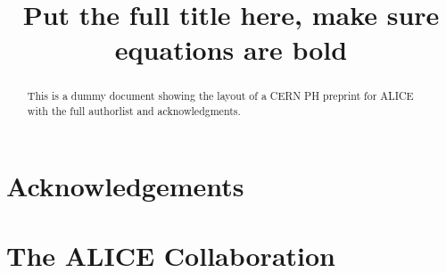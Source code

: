 \documentclass[ALICE,manyauthors]{cernphprep}
\begin{document}
%

\begin{titlepage}
%
%

\title{Put the full title here, make sure equations are bold}


\begin{abstract}
This is a dummy document showing the layout of a CERN PH preprint for ALICE with the full authorlist and acknowledgments.
\end{abstract}
\end{titlepage}
\setcounter{page}{2}

%
%
%
%

\newenvironment{acknowledgement}{\relax}{\relax}
\begin{acknowledgement}
\section*{Acknowledgements}
\end{acknowledgement}

%

\newpage
\appendix
%
%
\section{The ALICE Collaboration}
\label{app:collab}
\end{document}
